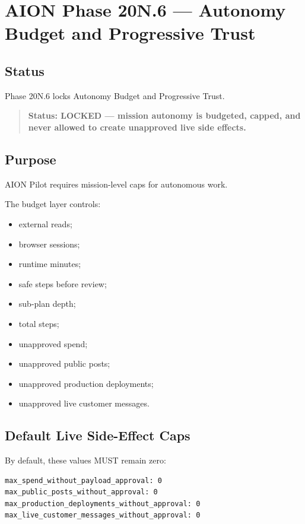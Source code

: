 \section{AION Phase 20N.6 --- Autonomy Budget and Progressive Trust}
\label{sec:aion-phase20n6-autonomy-budget-progressive-trust}

\subsection{Status}

Phase 20N.6 locks Autonomy Budget and Progressive Trust.

\begin{quote}
\textbf{Status: LOCKED --- mission autonomy is budgeted, capped, and never allowed to create unapproved live side effects.}
\end{quote}

\subsection{Purpose}

AION Pilot requires mission-level caps for autonomous work.

The budget layer controls:

\begin{itemize}
  \item external reads;
  \item browser sessions;
  \item runtime minutes;
  \item safe steps before review;
  \item sub-plan depth;
  \item total steps;
  \item unapproved spend;
  \item unapproved public posts;
  \item unapproved production deployments;
  \item unapproved live customer messages.
\end{itemize}

\subsection{Default Live Side-Effect Caps}

By default, these values MUST remain zero:

\begin{verbatim}
max_spend_without_payload_approval: 0
max_public_posts_without_approval: 0
max_production_deployments_without_approval: 0
max_live_customer_messages_without_approval: 0
\end{verbatim}

